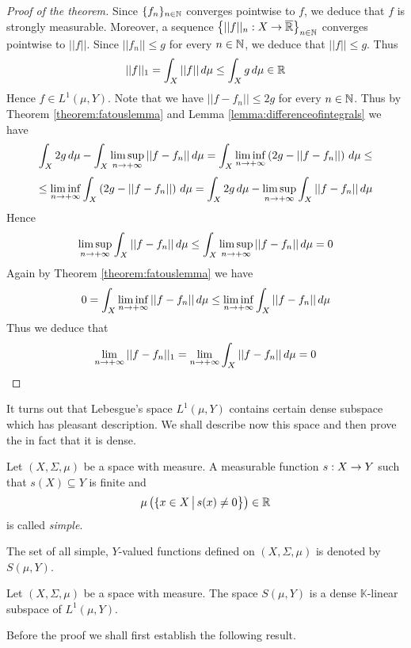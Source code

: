 \begin{proof}[Proof of the theorem]
Since $\{f_n\}_{n\in {\mathbb N}}$ converges pointwise to $f$, we deduce that $f$ is strongly measurable. Moreover, a sequence $\big\{||f||_n:X\rightarrow \overline{{\mathbb R}}\big\}_{n\in {\mathbb N}}$ converges pointwise to $||f||$. Since $||f_n||\leq g$ for every $n\in {\mathbb N}$, we deduce that $||f||\leq g$. Thus
$$||f||_1 = \int_X||f||\,d\mu \leq \int_Xg\,d\mu \in {\mathbb R}$$
Hence $f\in L^1(\mu, Y)$. Note that we have $||f - f_n|| \leq 2g$ for every $n\in {\mathbb N}$. Thus by Theorem \ref{theorem:fatouslemma} and Lemma \ref{lemma:differenceofintegrals} we have
$$\int_X2g\,d\mu - \int_X\limsup_{n\rightarrow +\infty}||f-f_n||\,d\mu  = \int_X\liminf_{n\rightarrow +\infty}\left(2g - ||f-f_n||\right)\,d\mu \leq$$
$$\leq \liminf_{n\rightarrow +\infty}\int_X\left(2g - ||f- f_n||\right)\,d\mu = \int_X2g\,d\mu - \limsup_{n\rightarrow +\infty}\int_X||f-f_n||\,d\mu$$
Hence
$$\limsup_{n\rightarrow +\infty}\int_X||f - f_n||\,d\mu \leq \int_X\limsup_{n\rightarrow +\infty}||f - f_n||\,d\mu = 0$$
Again by Theorem \ref{theorem:fatouslemma} we have
$$0 = \int_X\liminf_{n\rightarrow +\infty}||f-f_n||\,d\mu \leq \liminf_{n\rightarrow +\infty} \int_X||f - f_n||\,d\mu$$
Thus we deduce that
$$\lim_{n\rightarrow +\infty}||f - f_n||_1 = \lim_{n\rightarrow +\infty}\int_X||f - f_n||\,d\mu = 0$$
\end{proof}
\noindent
It turns out that Lebesgue's space $L^1(\mu, Y)$ contains certain dense subspace which has pleasant description. We shall describe now this space and then prove the in fact that it is dense.

\begin{definition}
Let $(X,\Sigma, \mu)$ be a space with measure. A measurable function $s:X\rightarrow Y$ such that $s(X)\subseteq Y$ is finite and
$$\mu\left(\{x\in X\,\big|\,s(x)\neq 0\big\}\right) \in {\mathbb R}$$
is called \textit{simple}.
\end{definition}
\noindent
The set of all simple, $Y$-valued functions defined on $(X,\Sigma, \mu)$ is denoted by $S(\mu, Y)$.

\begin{theorem}\label{theorem:simplearedense}
Let $(X,\Sigma, \mu)$ be a space with measure. The space $S(\mu, Y)$ is a dense $\mathbb{K}$-linear subspace of $L^1(\mu, Y)$.
\end{theorem}
\noindent
Before the proof we shall first establish the following result.

